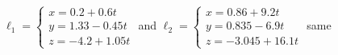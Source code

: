 {$\ell_1 = \begin{cases}x=0.2+0.6t\\y=1.33-0.45t\\z=-4.2+1.05t\end{cases}$ and 
$\ell_2 = \begin{cases}x=0.86+9.2t\\y=0.835-6.9t\\z=-3.045+16.1t\end{cases}$
}
{same
}

